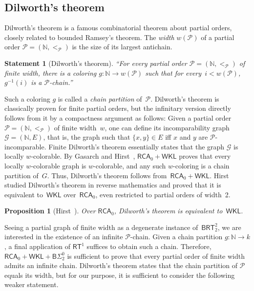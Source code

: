 \documentclass{article}
\def\P{\mathcal{P}}
\def\G{\mathcal{G}}
\newcommand{\BSig}{\mathsf{B}\Sigma^0}
\newcommand{\RCA}[0]{\mathsf{RCA}}
\newcommand{\WKL}[0]{\mathsf{WKL}}
\newcommand{\RT}[0]{\mathsf{RT}}
\newcommand{\BRT}[0]{\mathsf{BRT}}
\newcommand{\NN}[0]{\mathbb{N}}
\def\qt#1{``#1''}%
\newtheorem*{statement}{Statement}
\numberwithin{theorem}{section}
\newtheorem{proposition}[theorem]{Proposition}
\begin{document}
\subsection{Dilworth's theorem}

Dilworth's theorem is a famous combinatorial theorem about partial orders, closely related to bounded Ramsey's theorem. The \emph{width} $w(\P)$ of a partial order $\P = (\NN, <_\P)$ is the size of its largest antichain. 

\begin{statement}[Dilworth's theorem]
\qt{For every partial order $\P = (\NN, <_\P)$ of finite width, there is a coloring $g : \NN \to w(\P)$ such that for every~$i < w(\P)$, $g^{-1}(i)$ is a $\P$-chain.}
\end{statement}

Such a coloring $g$ is called a \emph{chain partition} of~$\P$. Dilworth's theorem is classically proven for finite partial orders, but the infinitary version directly follows from it by a compactness argument as follows: Given a  partial order $\P = (\NN, <_\P)$ of finite width~$w$, one can define its incomparability graph $\G = (\NN, E)$, that is, the graph such that $\{x, y\} \in E$ iff $x$ and $y$ are $\P$-incomparable. Finite Dilworth's theorem essentially states that the graph $\G$ is locally $w$-colorable. By Gasarch and Hirst~\cite[Theorem 4]{gasarch1998reverse}, $\RCA_0 + \WKL$ proves that every locally $w$-colorable graph is $w$-colorable, and any such $w$-coloring is a chain partition of~$G$.
Thus, Dilworth's theorem follows from~$\RCA_0 + \WKL$.
Hirst~\cite[Theorem 3.23]{hirst1987combinatorics} studied Dilworth's theorem in reverse mathematics and proved that it is equivalent to~$\WKL$ over~$\RCA_0$, even restricted to partial orders of width~2.

\begin{proposition}[{Hirst~\cite[Theorem 3.23]{hirst1987combinatorics}}]
Over $\RCA_0$, Dilworth's theorem is equivalent to~$\WKL$.
\end{proposition}

Seeing a partial graph of finite width as a degenerate instance of~$\BRT^2_2$, we are interested in the existence of an infinite $\P$-chain. Given a chain partition $g : \NN \to k$, a final application of $\RT^1$ suffices to obtain such a chain. Therefore, $\RCA_0 + \WKL + \BSig_2$ is sufficient to prove that every partial order of finite width admits an infinite chain. Dilworth's theorem states that the chain partition of $\P$ equals its width, but for our purpose, it is sufficient to consider the following weaker statement.
\end{document}
